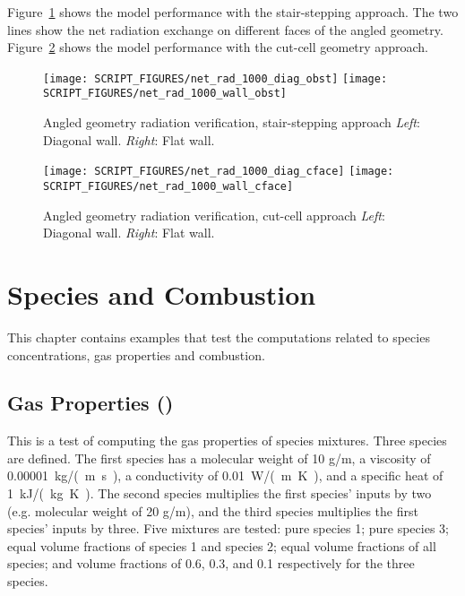 \documentclass[11pt]{book}
\begin{document}
Figure~\ref{net_rad_1000_obst} shows the model performance with the stair-stepping approach.
The two lines show the net radiation exchange on different faces of the angled geometry.
Figure~\ref{net_rad_1000_cface} shows the model performance with the cut-cell geometry approach.

\begin{figure}[ht]
\centering
\texttt{[image: SCRIPT\_FIGURES/net\_rad\_1000\_diag\_obst]}
\texttt{[image: SCRIPT\_FIGURES/net\_rad\_1000\_wall\_obst]}
\caption[The  case]{Angled geometry radiation verification, stair-stepping approach \emph{Left}: Diagonal wall.  \emph{Right}: Flat wall.}
\label{net_rad_1000_obst}
\end{figure}

\begin{figure}[ht]
\centering
\texttt{[image: SCRIPT\_FIGURES/net\_rad\_1000\_diag\_cface]}
\texttt{[image: SCRIPT\_FIGURES/net\_rad\_1000\_wall\_cface]}
\caption[The  case]{Angled geometry radiation verification, cut-cell approach \emph{Left}: Diagonal wall.  \emph{Right}: Flat wall.}
\label{net_rad_1000_cface}
\end{figure}


\chapter{Species and Combustion}

This chapter contains examples that test the computations related to species concentrations, gas properties and combustion.

\section{Gas Properties (\texorpdfstring{}{species\_props})}
\label{gas_properties}
\label{species_props}

This is a test of computing the gas properties of species mixtures. Three species are defined. The first species has a molecular weight of 10 g/m, a viscosity of 0.00001~\si{kg/(m.s)},
a conductivity of 0.01~\si{W/(m.K)}, and a specific heat of 1~\si{kJ/(kg.K)}. The second species multiplies the first species' inputs by two (e.g. molecular weight of 20 g/m), and the third species multiplies the first species' inputs by three. Five mixtures are tested: pure species 1; pure species 3; equal volume fractions of species 1 and species 2; equal volume fractions of all species; and volume fractions of 0.6, 0.3, and 0.1 respectively for the three species.
\end{document}

